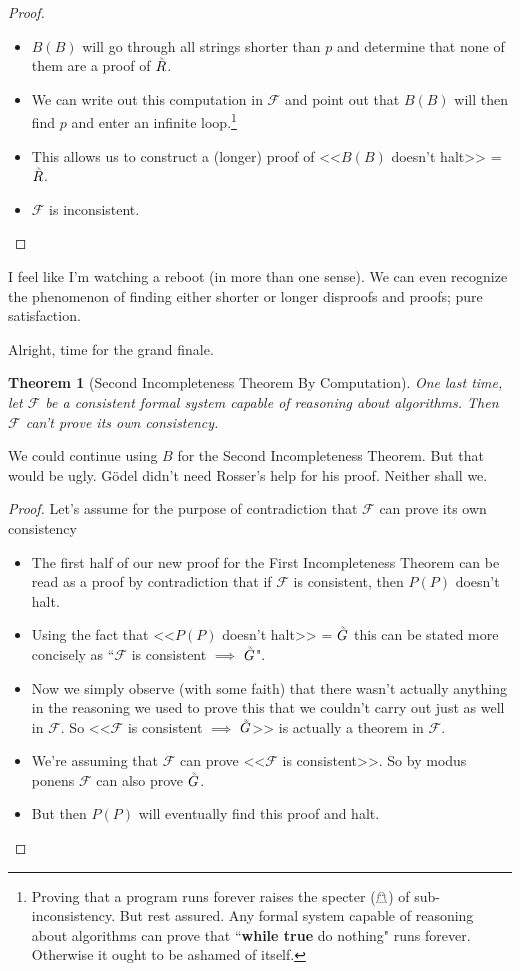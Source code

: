 \documentclass{article}
\newtheorem{theorem}{Theorem}
\newcommand{\impl}{\item[$\Rightarrow$]}
\newcommand{\F}{\ensuremath{\mathcal{F}}}
\newcommand{\iGoedel}{\ensuremath{\accentset{\scalebox{0.35}{$\infty$}}{G}}}
\newcommand{\iRosser}{\ensuremath{\accentset{\scalebox{0.35}{$\infty$}}{R}}}
\begin{document}
\begin{proof}
\begin{description}
\begin{description}
\begin{itemize}
\impl $B(B)$ will go through all strings shorter than $p$ and determine that none of them are a proof of $\iRosser$.
\impl We can write out this computation in $\F$ and point out that $B(B)$ will then find $p$ and enter an infinite loop.\footnote{Proving that a program runs forever raises the specter ($\mathghost$) of sub-inconsistency. But rest assured. Any formal system capable of reasoning about algorithms can prove that ``\textbf{while true} do nothing" runs forever. Otherwise it ought to be ashamed of itself.}
\impl This allows us to construct a (longer) proof of <<$B(B)$ doesn't halt>> = $\iRosser$.
\impl $\F$ is inconsistent. \lightning
\end{itemize}
\end{description}
\end{description}
\end{proof}

I feel like I'm watching a reboot (in more than one sense). We can even recognize the phenomenon of finding either shorter or longer disproofs and proofs; pure satisfaction.

Alright, time for the grand finale.

\begin{theorem}[Second Incompleteness Theorem By Computation]
One last time, let $\F$ be a consistent formal system capable of reasoning about algorithms. Then $\F$ can't prove its own consistency.
\end{theorem}

We could continue using $B$ for the Second Incompleteness Theorem. But that would be ugly. Gödel didn't need Rosser's help for his proof. Neither shall we.

\begin{proof}
Let's assume for the purpose of contradiction that $\F$ can prove its own consistency
\begin{itemize}
\impl The first half of our new proof for the First Incompleteness Theorem can be read as a proof by contradiction that if $\F$ is consistent, then $P(P)$ doesn't halt.
\impl Using the fact that <<$P(P)$ doesn't halt>> = $\iGoedel$ this can be stated more concisely as ``$\F$ is consistent $\implies$ $\iGoedel$".
\impl Now we simply observe (with some faith) that there wasn't actually anything in the reasoning we used to prove this that we couldn't carry out just as well in $\F$. So <<$\F$ is consistent $\implies$ $\iGoedel$>> is actually a theorem in $\F$.
\impl We're assuming that $\F$ can prove <<$\F$ is consistent>>. So by modus ponens $\F$ can also prove $\iGoedel$.
\impl But then $P(P)$ will eventually find this proof and halt. \lightning
\end{itemize}
\end{proof}
\end{document}
